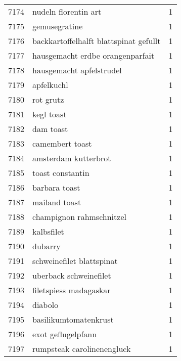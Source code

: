 \begin{tabular}{llr}
7174 &                               nudeln florentin art &      1 \\
7175 &                                      gemusegratine &      1 \\
7176 &             backkartoffelhalft blattspinat gefullt &      1 \\
7177 &                   hausgemacht erdbe orangenparfait &      1 \\
7178 &                           hausgemacht apfelstrudel &      1 \\
7179 &                                         apfelkuchl &      1 \\
7180 &                                          rot grutz &      1 \\
7181 &                                         kegl toast &      1 \\
7182 &                                          dam toast &      1 \\
7183 &                                    camembert toast &      1 \\
7184 &                               amsterdam kutterbrot &      1 \\
7185 &                                   toast constantin &      1 \\
7186 &                                      barbara toast &      1 \\
7187 &                                      mailand toast &      1 \\
7188 &                           champignon rahmschnitzel &      1 \\
7189 &                                         kalbsfilet &      1 \\
7190 &                                            dubarry &      1 \\
7191 &                          schweinefilet blattspinat &      1 \\
7192 &                             uberback schweinefilet &      1 \\
7193 &                             filetspiess madagaskar &      1 \\
7194 &                                            diabolo &      1 \\
7195 &                              basilikumtomatenkrust &      1 \\
7196 &                                 exot geflugelpfann &      1 \\
7197 &                         rumpsteak carolinenengluck &      1 \\

\end{tabular}
